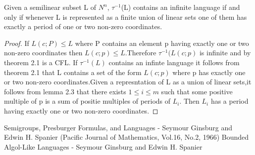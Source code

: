 \documentclass{beamer}
\begin{document}
\begin{frame}

\begin{theorem}[2.3]
Given a semilinear subset L of $N^{n}$, $\tau^{-1}$(L) contains an infinite language if and only if whenever L is represented as a finite union of linear sets one of them has exactly a period of one or two non-zero coordinates.
\end{theorem}

\begin{proof}
If $L(c; P) \leq L$ where P contains an element p having exactly one or two non-zero coordinates then 
$L(c; p) \leq L$.Therefore $\tau^{-1}(L(c;p)$ is infinite and by theorem 2.1 is a CFL.
If $\tau^{-1}(L)$ contains an infinte language it follows from theorem  2.1 that L contains a set of the form $L(c;p)$ where p 
has exactly one or two non-zero coordinates.Given a represntation of L as a union of linear sets,it follows from lemma 2.3 
that there exists $1\leq i \leq m$ such that some positive multiple of p is a sum of positie multiples of periods of $L_{i}$.
Then $L_{i}$ has a period having exactly one or two non-zero coordinates.
\end{proof}

\end{frame}



\begin{frame}
\begin{thebibliography}{99}
Semigroups, Presburger Formulas, and Languages - Seymour Ginsburg and Edwin H. Spanier (Pacific Journal of 
                     Mathematics, Vol.16, No.2, 1966)
Bounded Algol-Like Languages - Seymour Ginsburg and Edwin H. Spanier

\end{thebibliography}

\end{frame}
\end{document}

